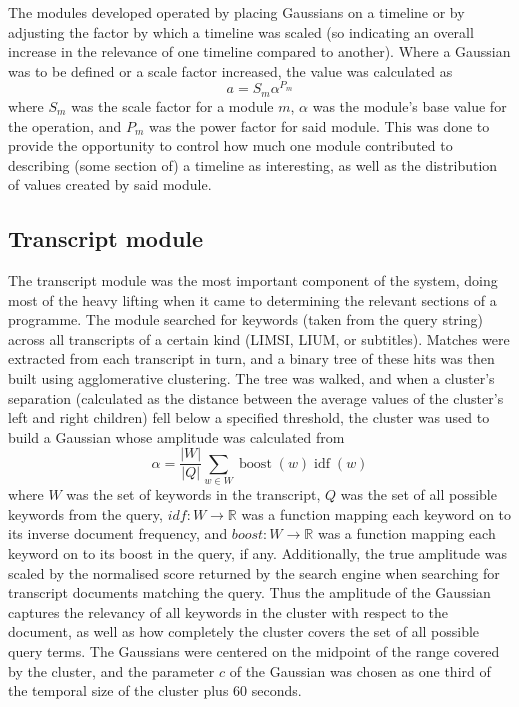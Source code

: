 \documentclass{../acm_proc_article-me11_tweaked}
\begin{document}
The modules developed operated by placing Gaussians on a timeline or by 
adjusting the factor by which a timeline was scaled (so indicating an overall 
increase in the relevance of one timeline compared to another). Where a 
Gaussian was to be defined or a scale factor increased, the value was 
calculated as 
\[a = S_m \alpha^{P_m}\]
where \(S_m\) was the scale factor for a module \(m\), \(\alpha\) was the 
module's base value for the operation, and \(P_m\) was the power factor for 
said module. This was done to provide the opportunity to control how much one 
module contributed to describing (some section of) a timeline as interesting, 
as well as the distribution of values created by said module.

\subsection{Transcript module}
The transcript module was the most important component of the system, doing 
most of the heavy lifting when it came to determining the relevant sections 
of a programme. The module searched for keywords (taken from the query string) 
across all transcripts of a certain kind (LIMSI, LIUM, or subtitles). Matches 
were extracted from each transcript in turn, and a binary tree of these hits 
was then built using agglomerative clustering. The tree was walked, and when 
a cluster's separation (calculated as the distance between the average values 
of the cluster's left and right children) fell below a specified threshold, 
the cluster was used to build a Gaussian whose amplitude was calculated from 
\[\alpha = \frac{| W |}{| Q |} \sum_{w \in W} \operatorname{boost}(w) \operatorname{idf}(w)\]
where \(W\) was the set of keywords in the transcript, \(Q\) was the set of 
all possible keywords from the query, \(idf : W \to \mathbb{R}\) was a 
function mapping each keyword on to its inverse document frequency, and 
\(boost : W \to \mathbb{R}\) was a function mapping each keyword on to its 
boost in the query, if any. Additionally, the true amplitude was scaled by the 
normalised score returned by the search engine when searching for transcript 
documents matching the query. Thus the amplitude of the Gaussian captures the 
relevancy of all keywords in the cluster with respect to the document, as well 
as how completely the cluster covers the set of all possible query terms. The 
Gaussians were centered on the midpoint of the range covered by the cluster, 
and the parameter \(c\) of the Gaussian was chosen as one third of the 
temporal size of the cluster plus 60 seconds.
\end{document}
